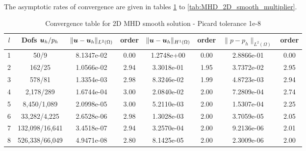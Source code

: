 The asymptotic rates of convergence are given in tables \ref{tab:MHD_2D_smooth_fluids} to \ref{tab:MHD_2D_smooth_multiplier}.
\begin{table}[h!] \small
\begin{center}
\begin{tabular}{cccccccc}
\hline
$l$ &    Dofs $\boldsymbol u_h/p_h$ & $\|\boldsymbol u-\boldsymbol u_h\|_{L^2(\Omega)}$ & order & $\|\boldsymbol u-\boldsymbol u_h\|_{H^1(\Omega)}$ & order &        $\|{p}-{p}_h\|_{L^2(\Omega)}$ & order \\
\hline
 1 &      50/9 &  8.1347e-02 &     0.00 &  1.2748e+00 &     0.00 &  2.8866e-01 &      0.00 \\
 2 &     162/25 &  1.0566e-02 &     2.94 &  3.3018e-01 &     1.95 &  3.7372e-02 &      2.95 \\
 3 &     578/81 &  1.3354e-03 &     2.98 &  8.3246e-02 &     1.99 &  4.8723e-03 &      2.94 \\
 4 &    2,178/289 &  1.6744e-04 &     3.00 &  2.0840e-02 &     2.00 &  7.2809e-04 &      2.74 \\
 5 &    8,450/1,089 &  2.0998e-05 &     3.00 &  5.2110e-03 &     2.00 &  1.5307e-04 &      2.25 \\
 6 &   33,282/4,225 &  2.6528e-06 &     2.98 &  1.3028e-03 &     2.00 &  3.7059e-05 &      2.05 \\
 7 &  132,098/16,641 &  3.4518e-07 &     2.94 &  3.2570e-04 &     2.00 &  9.2136e-06 &      2.01 \\
 8 &  526,338/66,049 &  4.9471e-08 &     2.80 &  8.1425e-05 &     2.00 &  2.3009e-06 &      2.00 \\

\hline
\end{tabular}
\caption{Convergence table for 2D MHD smooth solution - Picard tolerance 1e-8}
\label{tab:MHD_2D_smooth_fluids}
\end{center}
\end{table}


